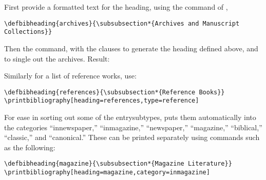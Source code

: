 \documentclass{ltxdockit}[2010/02/12]
\begin{document}
{First provide a formatted text for the heading, using the  command of , \eg
\begin{verbatim}
\defbibheading{archives}{\subsubsection*{Archives and Manuscript Collections}}
\end{verbatim}
%
Then the  command, with the clauses  to generate the heading defined above, and  to single out the archives. Result:

\printbibliography[heading=archives,type=customa]

Similarly for a list of reference works, use:
\begin{verbatim}
\defbibheading{references}{\subsubsection*{Reference Books}}
\printbibliography[heading=references,type=reference]
\end{verbatim}
\printbibliography[heading=references,type=reference]

For ease in sorting out some of the entrysubtypes,  puts them automatically into the categories ``innewspaper,'' ``inmagazine,'' ``newspaper,'' ``magazine,'' ``biblical,'' ``classic,'' and ``canonical.'' These can be printed separately using commands such as the following:
\begin{verbatim}
\defbibheading{magazine}{\subsubsection*{Magazine Literature}}
\printbibliography[heading=magazine,category=inmagazine]
\end{verbatim}
\printbibliography[heading=magazine,category=inmagazine]


}
\end{document}
